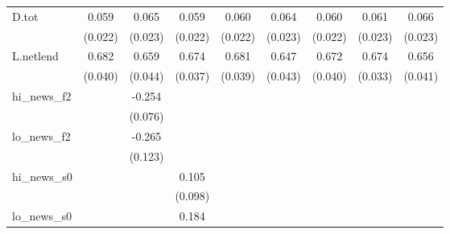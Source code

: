 {\begin{tabular}{l*{8}{c}}
D.tot       &       0.059\sym{**} &       0.065\sym{***}&       0.059\sym{**} &       0.060\sym{**} &       0.064\sym{**} &       0.060\sym{***}&       0.061\sym{**} &       0.066\sym{***}\\
            &     (0.022)         &     (0.023)         &     (0.022)         &     (0.022)         &     (0.023)         &     (0.022)         &     (0.023)         &     (0.023)         \\
\addlinespace
L.netlend   &       0.682\sym{***}&       0.659\sym{***}&       0.674\sym{***}&       0.681\sym{***}&       0.647\sym{***}&       0.672\sym{***}&       0.674\sym{***}&       0.656\sym{***}\\
            &     (0.040)         &     (0.044)         &     (0.037)         &     (0.039)         &     (0.043)         &     (0.040)         &     (0.033)         &     (0.041)         \\
\addlinespace
hi\_news\_f2  &                     &      -0.254\sym{***}&                     &                     &                     &                     &                     &                     \\
            &                     &     (0.076)         &                     &                     &                     &                     &                     &                     \\
\addlinespace
lo\_news\_f2  &                     &      -0.265\sym{**} &                     &                     &                     &                     &                     &                     \\
            &                     &     (0.123)         &                     &                     &                     &                     &                     &                     \\
\addlinespace
hi\_news\_s0  &                     &                     &       0.105         &                     &                     &                     &                     &                     \\
            &                     &                     &     (0.098)         &                     &                     &                     &                     &                     \\
\addlinespace
lo\_news\_s0  &                     &                     &       0.184\sym{**} &                     &                     &                     &                     &                     \\

\end{tabular}}
